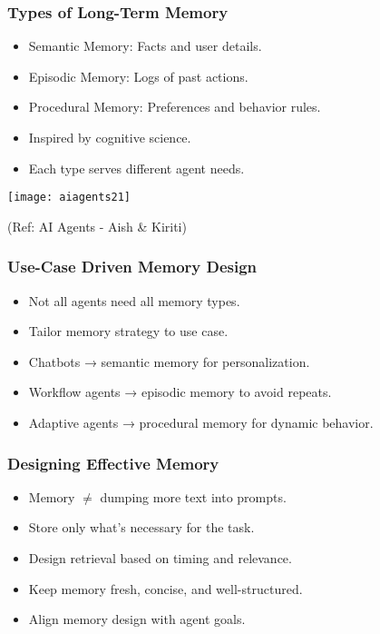 \begin{frame}[fragile]\frametitle{Types of Long-Term Memory}


		\begin{itemize}
		  \item Semantic Memory: Facts and user details.
		  \item Episodic Memory: Logs of past actions.
		  \item Procedural Memory: Preferences and behavior rules.
		  \item Inspired by cognitive science.
		  \item Each type serves different agent needs.
		\end{itemize}

		\begin{center}
		\texttt{[image: aiagents21]}

		{\tiny (Ref: AI Agents - Aish \& Kiriti)}

		\end{center}
\end{frame}

\begin{frame}[fragile]\frametitle{Use-Case Driven Memory Design}
\begin{itemize}
  \item Not all agents need all memory types.
  \item Tailor memory strategy to use case.
  \item Chatbots → semantic memory for personalization.
  \item Workflow agents → episodic memory to avoid repeats.
  \item Adaptive agents → procedural memory for dynamic behavior.
\end{itemize}
\end{frame}

\begin{frame}[fragile]\frametitle{Designing Effective Memory}
\begin{itemize}
  \item Memory $\neq$ dumping more text into prompts.
  \item Store only what’s necessary for the task.
  \item Design retrieval based on timing and relevance.
  \item Keep memory fresh, concise, and well-structured.
  \item Align memory design with agent goals.
\end{itemize}
\end{frame}

